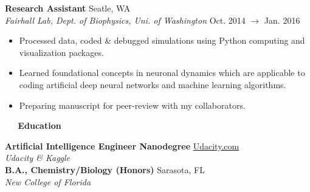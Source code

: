 \documentclass[a4paper,12pt]{article}
\newcommand{\resheading}[1]{{\vspace*{.06in} \colorbox{mygrey}{\begin{minipage}{\textwidth}{\textmd{\large \textbf{#1} \vphantom{p\^{E}}}}\end{minipage}}} }
\newcommand{\ressubheading}[4]{
        \textbf{#1} \hfill #2\\
        \textit{#3} \hfill #4 \\}
\begin{document}

\ressubheading{Research Assistant}{Seatle, WA}{Fairhall Lab, Dept. of Biophysics, Uni. of Washington}{Oct. 2014 $\rightarrow$ Jan. 2016}
\begin{itemize}[noitemsep,topsep=0pt,parsep=0pt,partopsep=0pt, nolistsep]
\item Processed data, coded \& debugged simulations using Python computing and visualization packages.
\item Learned foundational concepts in neuronal dynamics which are applicable to coding artificial deep neural networks and machine learning algorithms.
\item Preparing manuscript for peer-review with my collaborators.\\
\end{itemize}
 
\resheading{~\faGraduationCap~ Education}

    \ressubheading{Artificial Intelligence Engineer Nanodegree}{\href{https://www.udacity.com/nanodegree}{Udacity.com}}{Udacity \& Kaggle}{}%
 
    \ressubheading{B.A., Chemistry/Biology (Honors)}{Sarasota, FL}{New College of Florida}{}%

 
\end{document}
